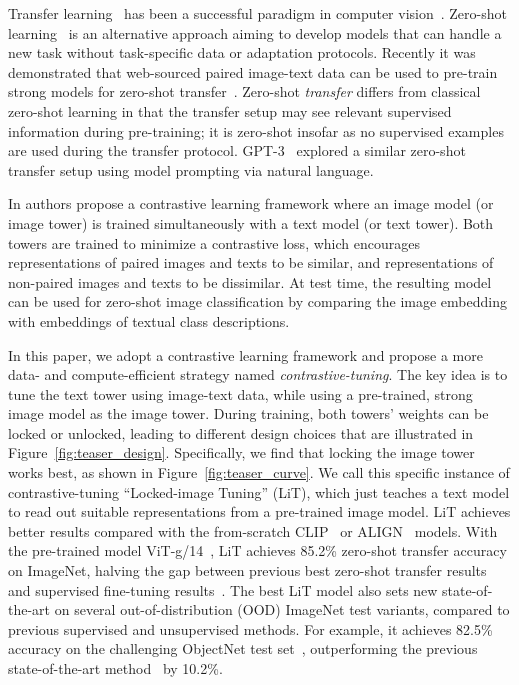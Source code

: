 \documentclass[10pt,twocolumn,letterpaper]{article}
\def \lit {LiT\xspace}
\def\objsota{82.5}
\begin{document}
Transfer learning~\cite{transfer_learning_survey} has been a successful paradigm in computer vision~\cite{imagenet_transfer_better,bit,instagram_resnext}.
Zero-shot learning~\cite{zero_data_learning,visual_attribute,zsl_good_bad_ugly} is an alternative approach aiming to develop models that can handle a new task without task-specific data or adaptation protocols.
Recently it was demonstrated that web-sourced paired image-text data can be used to pre-train strong models for zero-shot transfer~\cite{clip,align}. 
Zero-shot \textit{transfer} differs from classical zero-shot learning in that the transfer setup may see relevant supervised information during pre-training; it is zero-shot insofar as no supervised examples are used during the transfer protocol.
\mbox{GPT-3}~\cite{gpt3} explored a similar zero-shot transfer setup using model prompting via natural language. 

In \cite{clip,align} authors propose a contrastive learning frame\-work where an image model (or image tower) is trained simultaneously with a text model (or text tower). 
Both towers are trained to minimize a contrastive loss, which encourages representations of paired images and texts to be similar, and %
representations of non-paired images and texts to be dissimilar. 
At test time, the resulting model can be used for zero-shot image classification by comparing the image embedding with embeddings of textual class descriptions.

In this paper, we adopt a contrastive learning framework and propose a more data- and compute-efficient strategy named \textit{contrastive-tuning}. 
The key idea is to tune the text tower using image-text data, while using a pre-trained, strong image model as the image tower. 
During training, both towers' weights can be locked or unlocked, leading to different design choices that are illustrated in Figure~\ref{fig:teaser_design}.
Specifically, we find that locking the image tower works best, as shown in Figure~\ref{fig:teaser_curve}. 
We call this specific instance of contrastive-tuning “Locked-image Tuning” (\lit{}),
which just teaches a text model to read out suitable representations from a pre-trained image model. %
\lit{} achieves better results compared with the from-scratch CLIP~\cite{clip} or ALIGN~\cite{align} models.
With the pre-trained model ViT-g/14~\cite{vitg}, \lit{} achieves 85.2\% zero-shot transfer accuracy on ImageNet, halving the gap between previous best zero-shot transfer results~\cite{clip,align} and supervised fine-tuning results~\cite{vitg,coatnet}. The best \lit{} model also sets new state-of-the-art on several out-of-distribution (OOD) ImageNet test variants, compared to previous supervised and unsupervised methods.
For example, it achieves \objsota{}\% accuracy on the challenging ObjectNet test set~\cite{objectnet}, outperforming the previous state-of-the-art method~\cite{clip} by 10.2\%. 
\end{document}
